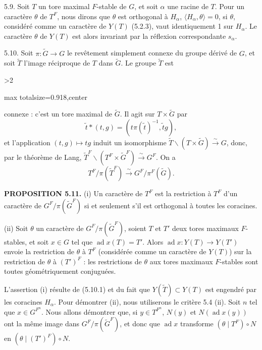 \documentclass[9pt,twoside]{extarticle}
\newcommand{\EditionPage}[3]{%
  \ifnum#1>2\clearpage\fi
  \pdfbookmark[1]{Printed page #2}{fr-folio-#2}%
  \hypertarget{fr-physical-#1}{}%
  \noindent\begin{adjustbox}{max totalsize={\textwidth}{0.918\textheight},center}
  \begin{minipage}[t]{\textwidth}
  \fontsize{9.4}{11.1}\selectfont\justifying
  #3
  \end{minipage}
  \end{adjustbox}%
}
\begin{document}
{5.9. Soit \(T\) un tore maximal \(F\)-stable de \(G\), et soit \(\alpha\) une racine de \(T\). Pour un caractère \(\theta\) de \(T^F\), nous dirons que \(\theta\) est orthogonal à \(H_\alpha\), \(\langle H_\alpha,\theta\rangle=0\), si \(\theta\), considéré comme un caractère de \(Y(T)\) (5.2.3), vaut identiquement 1 sur \(H_\alpha\). Le caractère \(\theta\) de \(Y(T)\) est alors invariant par la réflexion correspondante \(s_\alpha\).\par

5.10. Soit \(\pi:\widetilde G\to G\) le revêtement simplement connexe du groupe dérivé de \(G\), et soit \(\widetilde T\) l'image réciproque de \(T\) dans \(\widetilde G\). Le groupe \(\widetilde T\) est\par
}

\EditionPage{29}{130}{%
connexe : c'est un tore maximal de \(\widetilde G\). Il agit sur \(T\times\widetilde G\) par \[
\widetilde t*(t,g)=(t\pi(\widetilde t)^{-1},\widetilde t g),
\] et l'application \((t,g)\mapsto tg\) induit un isomorphisme \(\widetilde T\backslash(T\times\widetilde G)\xrightarrow{\sim}G\), donc, par le théorème de Lang, \(\widetilde T^F\backslash(T^F\times\widetilde G^F)\xrightarrow{\sim}G^F\). On a \[
\tag{5.10.1}
T^F/\pi(\widetilde T^F)\xrightarrow{\sim}G^F/\pi^F(\widetilde G).
\]\par

\noindent\textbf{PROPOSITION 5.11.} (i) Un caractère de \(T^F\) est la restriction à \(T^F\) d'un caractère de \(G^F/\pi(\widetilde G^F)\) si et seulement s'il est orthogonal à toutes les coracines.\par

(ii) Soit \(\theta\) un caractère de \(G^F/\pi(\widetilde G^F)\), soient \(T\) et \(T'\) deux tores maximaux \(F\)-stables, et soit \(x\in G\) tel que \(\operatorname{ad}x(T)=T'\). Alors \(\operatorname{ad}x:Y(T)\to Y(T')\) envoie la restriction de \(\theta\) à \(T^F\) (considérée comme un caractère de \(Y(T)\)) sur la restriction de \(\theta\) à \((T')^F\) : les restrictions de \(\theta\) aux tores maximaux \(F\)-stables sont toutes géométriquement conjuguées.\par

L'assertion (i) résulte de (5.10.1) et du fait que \(Y(\widetilde T)\subset Y(T)\) est engendré par les coracines \(H_\alpha\). Pour démontrer (ii), nous utiliserons le critère 5.4 (ii). Soit \(n\) tel que \(x\in G^{F^n}\). Nous allons démontrer que, si \(y\in T^{F^n}\), \(N(y)\) et \(N(\operatorname{ad}x(y))\) ont la même image dans \(G^F/\pi(\widetilde G^F)\), et donc que \(\operatorname{ad}x\) transforme \((\theta\mid T^F)\circ N\) en \((\theta\mid(T')^F)\circ N\).\par

}
\end{document}
